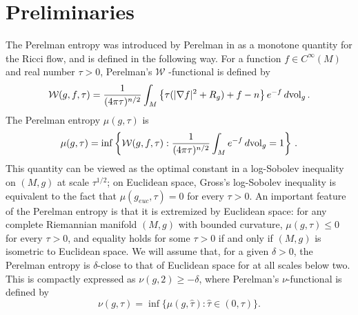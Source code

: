 \documentclass[11pt,reqno]{amsart}
\theoremstyle{remark}
\theoremstyle{definition}
\numberwithin{equation}{section}
\newcommand{\na}{{\nabla}}
\newcommand{\W}{{\mathcal{W}}}
\newcommand{\vol}{{\rm{vol}}}
\begin{document}
\section{Preliminaries}\label{sec: prelim}
 The Perelman entropy was introduced by Perelman in \cite{perelman2002entropy} as a monotone quantity for the Ricci flow, and is defined in the following way. For a function $f \in C^\infty(M)$ and real number $\tau>0$, Perelman's $\W$ -functional is defined by
\begin{equation}\label{eqn: W functional}
\W(g,f,\tau) = \frac{1}{(4\pi \tau)^{n/2}}\int_M \left\{ \tau(|\na f|^2 + R_g) +f-n\right\} {e^{-f}} \, d \vol_g  \,.
\end{equation}
The Perelman entropy $\mu(g,\tau)$ is 
\begin{equation}\label{eqn: perelman entropy def}
	\mu(g,\tau) = \inf \left\{ \W(g,f,\tau) : \frac{1}{(4\pi \tau)^{n/2}}\int_M {e^{-f}} \, d\vol_g= 1\right\}\,.
\end{equation}
This quantity can be viewed as the optimal constant in a log-Sobolev inequality on $(M,g)$ at scale $\tau^{1/2}$; on Euclidean space, Gross's log-Sobolev inequality \cite{Gross} is equivalent to the fact that $\mu(g_{euc}, \tau)=0$ for every $\tau >0$.
An important feature of the  Perelman entropy is that it is extremized by Euclidean space: for any complete Riemannian manifold $(M,g)$ with bounded curvature, $\mu(g,\tau) \leq 0$ for every $\tau>0$, and equality holds for some $\tau>0$ if and only if $(M,g)$ is isometric to Euclidean space.   We will assume that, for a given $\delta>0$, the Perelman entropy is $\delta$-close to that of Euclidean space for at all scales below two. This is compactly expressed as $\nu(g,2)\geq -\delta$, where Perelman's $\nu$-functional is defined by
\begin{equation*}
	\nu(g,\tau) = \inf\{ \mu(g,\hat{\tau}): \hat{\tau}\in (0, \tau)\}.
\end{equation*} 
\end{document}
